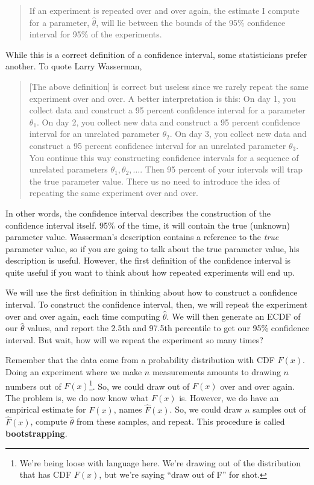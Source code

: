 \begin{quote}
    If an experiment is repeated over and over again, the estimate I compute for a parameter, $\hat{\theta}$, will lie between the bounds of the 95\% confidence interval for 95\% of the experiments.
\end{quote}

While this is a correct definition of a confidence interval, some statisticians prefer another. To quote Larry Wasserman,

\begin{quote}
    [The above definition] is correct but useless since we rarely repeat the same experiment over and over. A better interpretation is this: On day 1, you collect data and construct a 95 percent confidence interval for a parameter $\theta_1$. On day 2, you collect new data and construct a 95 percent confidence interval for an unrelated parameter $\theta_2$. On day 3, you collect new data and construct a 95 percent confidence interval for an unrelated parameter $\theta_3$. You continue this way constructing confidence intervals for a sequence of unrelated parameters $\theta_1, \theta_2, \ldots$. Then 95 percent of your intervals will trap the true parameter value. There us no need to introduce the idea of repeating the same experiment over and over.
\end{quote}

In other words, the confidence interval describes the construction of the confidence interval itself. 95\% of the time, it will contain the true (unknown) parameter value. Wasserman's description contains a reference to the \textit{true} parameter value, so if you are going to talk about the true parameter value, his description is useful. However, the first definition of the confidence interval is quite useful if you want to think about how repeated experiments will end up.

We will use the first definition in thinking about how to construct a confidence interval. To construct the confidence interval, then, we will repeat the experiment over and over again, each time computing $\hat{\theta}$. We will then generate an ECDF of our $\hat{\theta}$ values, and report the 2.5th and 97.5th percentile to get our 95\% confidence interval. But wait, how will we repeat the experiment so many times?

Remember that the data come from a probability distribution with CDF $F(x)$. Doing an experiment where we make $n$ measurements amounts to drawing $n$ numbers out of $F(x)$\footnote{We're being loose with language here. We're drawing out of the distribution that has CDF $F(x)$, but we're saying ``draw out of F'' for shot.}. So, we could draw out of $F(x)$ over and over again. The problem is, we do now know what $F(x)$ is. However, we do have an empirical estimate for $F(x)$, names $\hat{F}(x)$. So, we could draw $n$ samples out of $\hat{F}(x)$, compute $\hat{\theta}$ from these samples, and repeat. This procedure is called \textbf{bootstrapping}.

